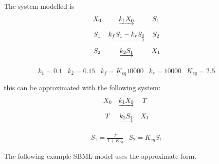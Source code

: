 \documentclass[10pt,twocolumntoc]{cekarticle}
\begin{document}
The system modelled is
\begin{equation*}
  \begin{array}{@{}ccc@{}}
    X_0 & \underrightarrow{k_1 X_0} & S_1 \\ \\[-4pt]
    S_1 & \underrightarrow{k_f S_1 - k_r S_2} & S_2 \\ \\[-4pt]
    S_2 & \underrightarrow{k_2 S_1} & X_1\\ \\[-4pt]
  \end{array}
\end{equation*}
\begin{equation*}
  \begin{array}{lllll}
    k_1 = 0.1 & k_2 = 0.15 & k_f = K_{eq} 10000 & k_r = 10000 & K_{eq} = 2.5\\ \\[-4pt]
  \end{array}
\end{equation*}
this can be approximated with the following system:
\begin{equation*}
  \begin{array}{@{}ccc@{}}
    X_0 & \underrightarrow{k_1 X_0} & T \\ \\[-4pt]
    T & \underrightarrow{k_2 S_1} & X_1\\ \\[-4pt]
  \end{array}
\end{equation*}
\begin{equation*}
  \begin{array}{ll}
    S_1 = \frac{T}{1 + K_{eq}} & S_2 = K_{eq} S_1\\ \\[-4pt]
  \end{array}
\end{equation*}
The following example SBML model uses the approximate form.
\end{document}
